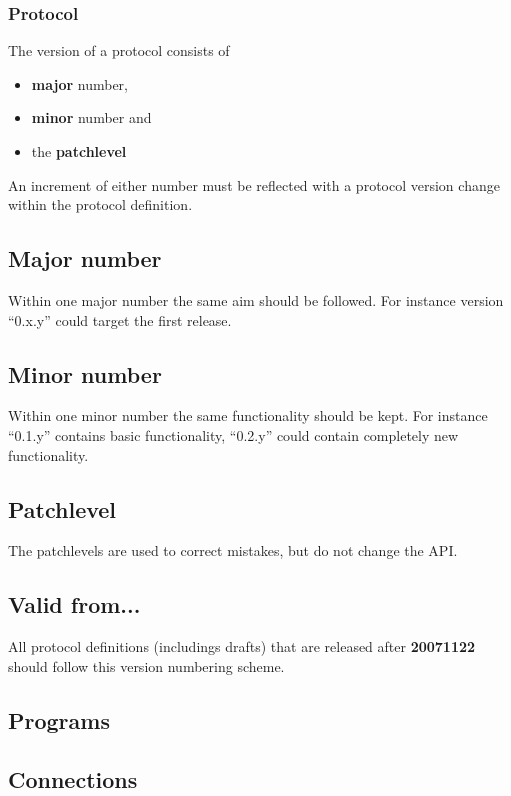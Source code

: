 \documentclass[12pt,a4paper]{book}
\begin{document}
\subsubsection{Protocol}
The version of a protocol consists of 
\begin{itemize}
\item \textbf{major} number,
\item \textbf{minor} number and
\item the \textbf{patchlevel}
\end{itemize}
An increment of either number must be reflected with a protocol version change
within the protocol definition.
\subsection{Major number}
Within one major number the same aim should be followed. For instance
version "`0.x.y"' could target the first release.
\subsection{Minor number}
Within one minor number the same functionality should be kept.
For instance "`0.1.y"' contains basic functionality, "`0.2.y"' could
contain completely new functionality.
\subsection{Patchlevel}
The patchlevels are used to correct mistakes, but do not change the API.
\subsection{Valid from...}
All protocol definitions (includings drafts) that are released after
\textbf{20071122} should follow this version numbering scheme.
\subsection{Programs}
\subsection{Connections}
\end{document}
